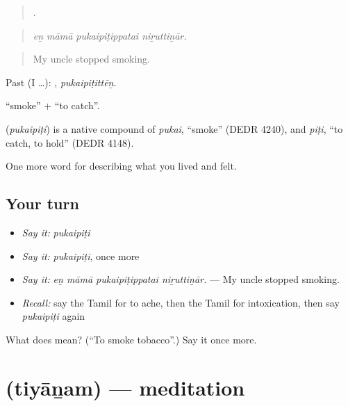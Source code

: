 \begin{quote}
   .
\end{quote}

\begin{quote}
\emph{eṉ māmā pukaipiṭippatai niṟuttiṉār.}
\end{quote}

\begin{quote}
My uncle stopped smoking.
\end{quote}

Past (I …): , \emph{pukaipiṭittēṉ}.

 \textquotedblleft{}smoke\textquotedblright{} +  \textquotedblleft{}to catch\textquotedblright{}.

\begin{cousinweb}
\textbf{} (\emph{pukaipiṭi}) is a native compound of  \emph{pukai}, \textquotedblleft{}smoke\textquotedblright{} (DEDR 4240), and  \emph{piṭi}, \textquotedblleft{}to catch, to hold\textquotedblright{} (DEDR 4148).
\end{cousinweb}

\begin{grammarlens}[title={What you've built}]
One more word for describing what you lived and felt.
\end{grammarlens}

\subsection*{Your turn}
\begin{itemize}
\raggedright
  \item \emph{Say it:} \emph{pukaipiṭi}
  \item \emph{Say it:} \emph{pukaipiṭi}, once more
  \item \emph{Say it:} \emph{eṉ māmā pukaipiṭippatai niṟuttiṉār.} — My uncle stopped smoking.
  \item \emph{Recall:} say the Tamil for to ache, then the Tamil for intoxication, then say \emph{pukaipiṭi} again
\end{itemize}

\begin{tcolorbox}[breakable,colback=teal!4,colframe=teal!35!black,title={Before you move on}]
What does  mean? (\textquotedblleft{}To smoke tobacco\textquotedblright{}.) Say it once more.
\end{tcolorbox}
\section[\texorpdfstring{\ta{தியானம்} (tiyāṉam)}{தியானம் (tiyāṉam)}]{ (tiyāṉam) — meditation}

